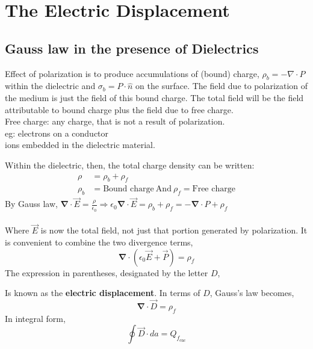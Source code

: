 \section{The Electric Displacement}

\subsection{Gauss law in the presence of Dielectrics}
Effect of polarization is to produce accumulations of (bound) charge, $\rho_{b}=-\nabla\cdot P$ within the dielectric and $\sigma_{b}=P\cdot \hat{n}$ on the surface. The field due to polarization of the medium is just the field of this bound charge.  The total field will be the field attributable to bound charge plus the field due to free charge.\\
Free charge: any charge, that is not a result of polarization.\\
eg: electrons on a conductor\\
ions embedded in the dielectric material.

 Within the dielectric, then, the total charge density can be written:
 \begin{align*}
\rho&=\rho_{b}+\rho_{f} \\
\rho_{b}&=\text{Bound charge} \ \text{And}\ \rho_{f}= \text{Free charge} 
 \end{align*}
 By Gauss law,
 $\boldsymbol{\nabla} \cdot \vec{E}=\frac{\rho}{\epsilon_{0} }\Longrightarrow  \epsilon_{0}\boldsymbol{\nabla} \cdot \vec{E} =\rho_{b}+\rho_{f}=-\boldsymbol{\nabla} \cdot {P}+\rho_{f}$
 \\\\Where $\vec{E}$ is now the total field, not just that portion generated by polarization. It is convenient to combine the two divergence terms,
 $$
 \boldsymbol{\nabla} \cdot\left(\epsilon_{0} \vec{E}+\vec{P}\right)=\rho_{f}
 $$
 The expression in parentheses, designated by the letter ${D}$,
 \begin{center}
 \end{center}
  
 Is known as the \textbf{electric displacement}. In terms of ${D}$, Gauss's law becomes,
 $$
{\boldsymbol{\nabla} \cdot\vec{D}=\rho_{f}}
 $$
In integral form,
 $$
 \oint \vec{D} \cdot d{a}=Q_{f_{\mathrm{enc}}}
 $$

